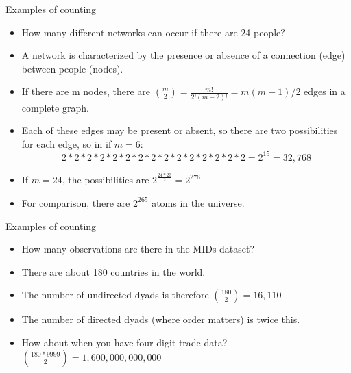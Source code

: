 \documentclass{beamer}
\numberwithin{equation}{section}
\begin{document}
\begin{frame}{Examples of counting}
\begin{itemize}
\item How many different networks can occur if there are 24 people?\pause
\item A network is characterized by the presence or absence of a connection (edge) between people (nodes).\pause
\item If there are m nodes, there are ${{m}\choose{2}}=\frac{m!}{2!(m-2)!}=m(m-1)/2$ edges in a complete graph.\pause
\item Each of these edges may be present or absent, so there are two possibilities for each edge, so in if $m=6$:
$$2*2*2*2*2*2*2*2*2*2*2*2*2*2*2=2^{15}=32,768$$
\item If $m=24$, the possibilities are $2^{\frac{24*23}{2}}=2^{276}$\pause
\item For comparison, there are $2^{265}$ atoms in the universe.
\end{itemize}
\end{frame}



\begin{frame}{Examples of counting}
\begin{itemize}
\item How many observations are there in the MIDs dataset?\pause
\item There are about 180 countries in the world.
\item The number of undirected dyads is therefore ${{180}\choose{2}}=16,110$ 
\item The number of directed dyads (where order matters) is twice this.
\item How about when you have four-digit trade data? ${{180*9999}\choose{2}}=1,600,000,000,000$
\end{itemize}
\end{frame}
\end{document}
